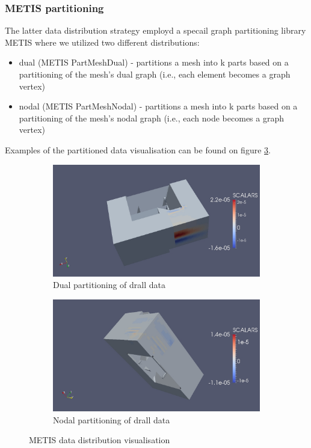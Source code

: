 \documentclass{article}
\begin{document}
\subsubsection{METIS partitioning}
The latter data distribution strategy employd a specail graph partitioning library METIS where we utilized two different distributions:
\begin{itemize}
	\item dual (METIS PartMeshDual) - partitions a mesh into k parts based on a partitioning of the mesh’s dual graph (i.e., each element becomes a graph vertex)
	\item nodal (METIS PartMeshNodal) - partitions a mesh into k parts based on a partitioning of the mesh’s nodal graph (i.e., each node becomes a graph vertex)
\end{itemize}
Examples of the partitioned data visualisation can be found on figure \ref{fig:5}.
\begin{figure}
	\centering
	\begin{subfigure}[b]{0.45\textwidth}
		\includegraphics[width=\textwidth]{drall-dual.jpg}
		\caption{Dual partitioning of drall data}
		\label{fig:dual}
	\end{subfigure}%
	\begin{subfigure}[b]{0.45\textwidth}
		\includegraphics[width=\textwidth]{drall-nodal.jpg}
		\caption{Nodal partitioning of drall data}
		\label{fig:nodal}
	\end{subfigure}
	\caption{METIS data distribution visualisation}\label{fig:5}
\end{figure}
\end{document}
